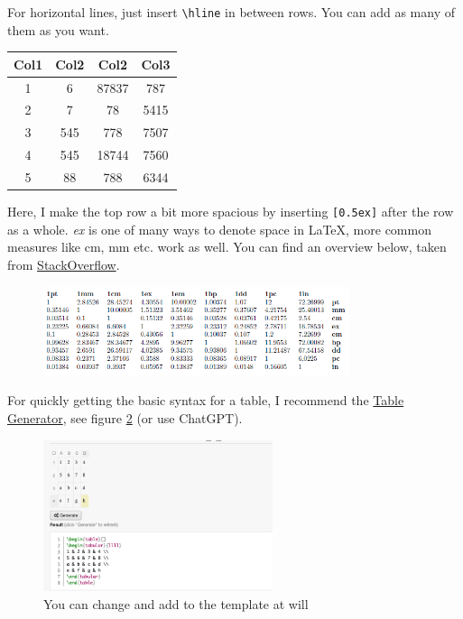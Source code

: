 \documentclass{article}
\begin{document}
For horizontal lines, just insert \verb|\hline| in between rows. You can add as many of them as you want.\\
\begin{center}
\begin{tabular}{||c c c c||} 
 \hline
 Col1 & Col2 & Col2 & Col3 \\ [0.5ex] 
 \hline\hline
 1 & 6 & 87837 & 787 \\ 
 \hline
 2 & 7 & 78 & 5415 \\
 \hline
 3 & 545 & 778 & 7507 \\
 \hline
 4 & 545 & 18744 & 7560 \\
 \hline
 5 & 88 & 788 & 6344 \\ [1ex] 
 \hline
\end{tabular}
\end{center} 



Here, I make the top row a bit more spacious by inserting \verb|[0.5ex]| after the row as a whole. \textit{ex} is one of many ways to denote space in LaTeX, more common measures like cm, mm etc. work as well. You can find an overview below, taken from \href{https://tex.stackexchange.com/questions/8260/what-are-the-various-units-ex-em-in-pt-bp-dd-pc-expressed-in-mm}{StackOverflow}.

\begin{figure}[H]
    \centering
    \includegraphics[width=0.8\textwidth]{spaces_latex.png}
    \label{fig:spaces}
\end{figure}

For quickly getting the basic syntax for a table, I recommend the \href{https://www.tablesgenerator.com/\#}{Table Generator}, see figure \ref{fig:table_generator} (or use ChatGPT).\\
\begin{figure}[H]
    \centering
    \includegraphics[width=0.6\textwidth]{table_generator.png}
    \caption{You can change and add to the template at will}
    \label{fig:table_generator}
\end{figure}
\end{document}

